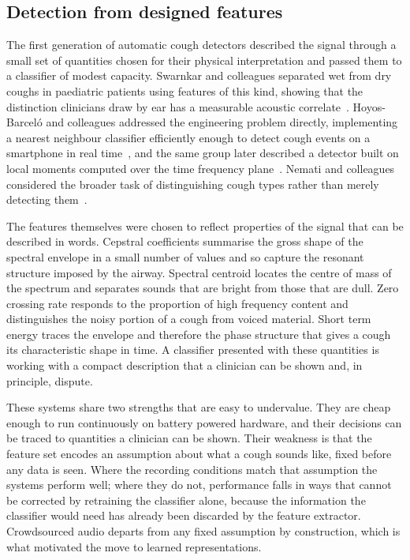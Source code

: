 \documentclass[pdflatex,sn-mathphys-num]{sn-jnl}
\begin{document}
\subsection{Detection from designed features}\label{sec:rel-handcrafted}

The first generation of automatic cough detectors described the signal through
a small set of quantities chosen for their physical interpretation and passed
them to a classifier of modest capacity. Swarnkar and colleagues separated wet
from dry coughs in paediatric patients using features of this kind, showing
that the distinction clinicians draw by ear has a measurable acoustic
correlate~\cite{swarnkar2013}. Hoyos-Barcel\'o and colleagues addressed the
engineering problem directly, implementing a nearest neighbour classifier
efficiently enough to detect cough events on a smartphone in real
time~\cite{hoyosbarcelo2018}, and the same group later described a detector
built on local moments computed over the time frequency
plane~\cite{mongealvarez2019}. Nemati and colleagues considered the broader
task of distinguishing cough types rather than merely detecting
them~\cite{nemati2019}.

The features themselves were chosen to reflect properties of the signal that
can be described in words. Cepstral coefficients summarise the gross shape of
the spectral envelope in a small number of values and so capture the resonant
structure imposed by the airway. Spectral centroid locates the centre of mass
of the spectrum and separates sounds that are bright from those that are
dull. Zero crossing rate responds to the proportion of high frequency content
and distinguishes the noisy portion of a cough from voiced material. Short
term energy traces the envelope and therefore the phase structure that gives
a cough its characteristic shape in time. A classifier presented with these
quantities is working with a compact description that a clinician can be
shown and, in principle, dispute.

These systems share two strengths that are easy to undervalue. They are cheap
enough to run continuously on battery powered hardware, and their decisions
can be traced to quantities a clinician can be shown. Their weakness is that
the feature set encodes an assumption about what a cough sounds like, fixed
before any data is seen. Where the recording conditions match that assumption
the systems perform well; where they do not, performance falls in ways that
cannot be corrected by retraining the classifier alone, because the
information the classifier would need has already been discarded by the
feature extractor. Crowdsourced audio departs from any fixed assumption by
construction, which is what motivated the move to learned representations.
\end{document}

